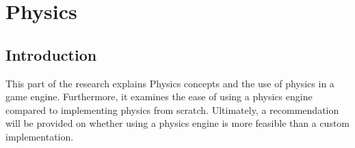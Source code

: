 \documentclass{projdoc}
\begin{document}
% 
% 
% 
% 
% 
% 
% 

\section{Physics}



\subsection{Introduction}

This part of the research explains Physics concepts and the use of physics in a game
engine. Furthermore, it examines the ease of using a physics engine compared to
implementing physics from scratch. Ultimately, a recommendation will be provided on
whether using a physics engine is more feasible than a custom implementation.
\end{document}
